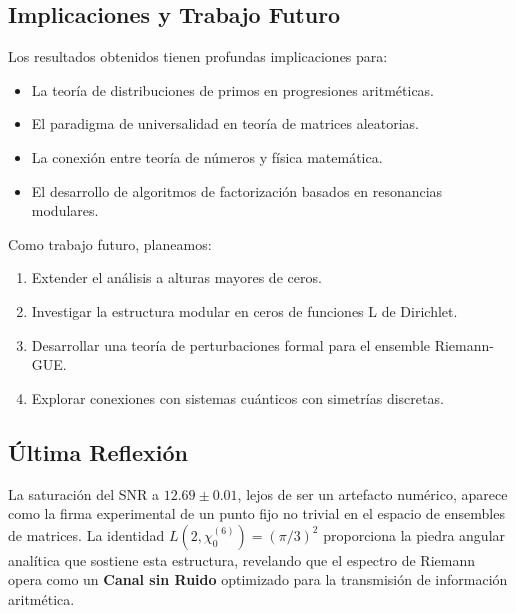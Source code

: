 \documentclass[12pt, a4paper]{article}
\theoremstyle{plain}
\theoremstyle{definition}
\theoremstyle{remark}
\begin{document}
\subsection{Implicaciones y Trabajo Futuro}
\label{subsec:implicaciones}

Los resultados obtenidos tienen profundas implicaciones para:
\begin{itemize}
    \item La teoría de distribuciones de primos en progresiones aritméticas.
    \item El paradigma de universalidad en teoría de matrices aleatorias.
    \item La conexión entre teoría de números y física matemática.
    \item El desarrollo de algoritmos de factorización basados en resonancias modulares.
    
\end{itemize}

Como trabajo futuro, planeamos:
\begin{enumerate}
    \item Extender el análisis a alturas mayores de ceros.
    \item Investigar la estructura modular en ceros de funciones L de Dirichlet.
    \item Desarrollar una teoría de perturbaciones formal para el ensemble Riemann-GUE.
    \item Explorar conexiones con sistemas cuánticos con simetrías discretas.
\end{enumerate}

\subsection{Última Reflexión}
\label{subsec:reflexion}

La saturación del SNR a $12.69 \pm 0.01$, lejos de ser un artefacto numérico, aparece como la firma experimental de un punto fijo no trivial en el espacio de ensembles de matrices. La identidad $L(2,\chi_0^{(6)}) = (\pi/3)^2$ proporciona la piedra angular analítica que sostiene esta estructura, revelando que el espectro de Riemann opera como un \textbf{Canal sin Ruido} optimizado para la transmisión de información aritmética.

\appendix

\end{document}
